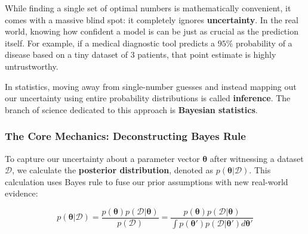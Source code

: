 \documentclass{article}
\begin{document}
While finding a single set of optimal numbers is mathematically convenient, it comes with a massive blind spot: it completely ignores \textbf{uncertainty}. In the real world, knowing how confident a model is can be just as crucial as the prediction itself. For example, if a medical diagnostic tool predicts a $95\%$ probability of a disease based on a tiny dataset of $3$ patients, that point estimate is highly untrustworthy. 

In statistics, moving away from single-number guesses and instead mapping out our uncertainty using entire probability distributions is called \textbf{inference}. The branch of science dedicated to this approach is \textbf{Bayesian statistics}.

\subsubsection{The Core Mechanics: Deconstructing Bayes Rule}
To capture our uncertainty about a parameter vector $\boldsymbol{\theta}$ after witnessing a dataset $\mathcal{D}$, we calculate the \textbf{posterior distribution}, denoted as $p(\boldsymbol{\theta}|\mathcal{D})$. This calculation uses Bayes rule to fuse our prior assumptions with new real-world evidence:

\begin{equation}
p(\boldsymbol{\theta}|\mathcal{D}) = \frac{p(\boldsymbol{\theta})p(\mathcal{D}|\boldsymbol{\theta})}{p(\mathcal{D})} = \frac{p(\boldsymbol{\theta})p(\mathcal{D}|\boldsymbol{\theta})}{\int p(\boldsymbol{\theta}')p(\mathcal{D}|\boldsymbol{\theta}')d\boldsymbol{\theta}'}
\end{equation}
\end{document}
